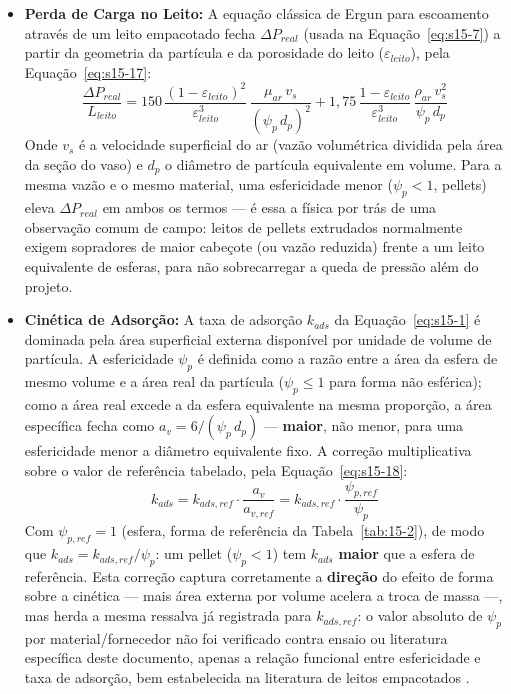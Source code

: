 \documentclass[12pt,a4paper]{article}
\numberwithin{equation}{section}
\numberwithin{table}{section}
\numberwithin{figure}{section}
\begin{document}
{		\begin{itemize}
			\item \textbf{Perda de Carga no Leito:} A equação clássica de Ergun para escoamento através de um leito empacotado fecha $\Delta P_{real}$ (usada na Equação~\eqref{eq:s15-7}) a partir da geometria da partícula e da porosidade do leito ($\varepsilon_{leito}$), pela Equação~\eqref{eq:s15-17}:
			\begin{equation}\label{eq:s15-17}
			\frac{\Delta P_{real}}{L_{leito}} = 150 \, \frac{(1-\varepsilon_{leito})^2}{\varepsilon_{leito}^3} \, \frac{\mu_{ar} \, v_s}{(\psi_p \, d_p)^2} + 1{,}75 \, \frac{1-\varepsilon_{leito}}{\varepsilon_{leito}^3} \, \frac{\rho_{ar} \, v_s^2}{\psi_p \, d_p}
		\end{equation}
			Onde $v_s$ é a velocidade superficial do ar (vazão volumétrica dividida pela área da seção do vaso) e $d_p$ o diâmetro de partícula equivalente em volume. Para a mesma vazão e o mesmo material, uma esfericidade menor ($\psi_p < 1$, pellets) eleva $\Delta P_{real}$ em ambos os termos — é essa a física por trás de uma observação comum de campo: leitos de pellets extrudados normalmente exigem sopradores de maior cabeçote (ou vazão reduzida) frente a um leito equivalente de esferas, para não sobrecarregar a queda de pressão além do projeto.
			\item \textbf{Cinética de Adsorção:} A taxa de adsorção $k_{ads}$ da Equação~\eqref{eq:s15-1} é dominada pela área superficial externa disponível por unidade de volume de partícula. A esfericidade $\psi_p$ é definida como a razão entre a área da esfera de mesmo volume e a área real da partícula ($\psi_p \le 1$ para forma não esférica); como a área real excede a da esfera equivalente na mesma proporção, a área específica fecha como $a_v = 6/(\psi_p \, d_p)$ \cite{ergun} — \textbf{maior}, não menor, para uma esfericidade menor a diâmetro equivalente fixo. A correção multiplicativa sobre o valor de referência tabelado, pela Equação~\eqref{eq:s15-18}:
			\begin{equation}\label{eq:s15-18}
			k_{ads} = k_{ads,ref} \cdot \frac{a_v}{a_{v,ref}} = k_{ads,ref} \cdot \frac{\psi_{p,ref}}{\psi_p}
		\end{equation}
			Com $\psi_{p,ref} = 1$ (esfera, forma de referência da Tabela~\ref{tab:15-2}), de modo que $k_{ads} = k_{ads,ref}/\psi_p$: um pellet ($\psi_p < 1$) tem $k_{ads}$ \textbf{maior} que a esfera de referência. Esta correção captura corretamente a \textbf{direção} do efeito de forma sobre a cinética — mais área externa por volume acelera a troca de massa —, mas herda a mesma ressalva já registrada para $k_{ads,ref}$: o valor absoluto de $\psi_p$ por material/fornecedor não foi verificado contra ensaio ou literatura específica deste documento, apenas a relação funcional entre esfericidade e taxa de adsorção, bem estabelecida na literatura de leitos empacotados \cite{ergun}.

\end{itemize}}
\end{document}
